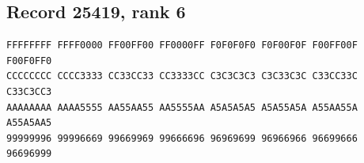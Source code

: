 \documentclass[11pt]{amsart}
\theoremstyle{definition}
\theoremstyle{remark}
\numberwithin{equation}{section}
\numberwithin{table}{section}
\begin{document}
\subsection*{Record 25419, rank 6}
\begin{Verbatim}[fontsize=\scriptsize,xleftmargin=1em]
FFFFFFFF FFFF0000 FF00FF00 FF0000FF F0F0F0F0 F0F00F0F F00FF00F F00F0FF0
CCCCCCCC CCCC3333 CC33CC33 CC3333CC C3C3C3C3 C3C33C3C C33CC33C C33C3CC3
AAAAAAAA AAAA5555 AA55AA55 AA5555AA A5A5A5A5 A5A55A5A A55AA55A A55A5AA5
99999996 99996669 99669969 99666696 96969699 96966966 96699666 96696999
\end{Verbatim}
\par
{}\par
\end{document}
